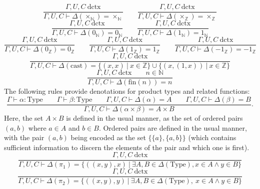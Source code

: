 \documentclass[11pt]{article}
\begin{document}
\begin{equation}
	\frac{\Gamma,U,C\ \text{dctx}}
	{\Gamma,U,C \vdash \Delta(\times_{\mathbb{N}}) = \times_{\mathbb{N}}}
	\qquad
	\frac{\Gamma,U,C\ \text{dctx}}
	{\Gamma,U,C \vdash \Delta(\times_{\mathbb{Z}}) = \times_{\mathbb{Z}}}
\end{equation}
\begin{equation}
	\frac{\Gamma,U,C\ \text{dctx}}
	{\Gamma,U,C \vdash \Delta(0_{\mathbb{N}}) = 0_{\mathbb{N}}}
	\qquad
	\frac{\Gamma,U,C\ \text{dctx}}
	{\Gamma,U,C \vdash \Delta(1_{\mathbb{N}}) = 1_{\mathbb{N}}}
\end{equation}
\begin{equation}
	\frac{\Gamma,U,C\ \text{dctx}}
	{\Gamma,U,C \vdash \Delta(0_{\mathbb{Z}}) = 0_{\mathbb{Z}}}
	\qquad
	\frac{\Gamma,U,C\ \text{dctx}}
	{\Gamma,U,C \vdash \Delta(1_{\mathbb{Z}}) = 1_{\mathbb{Z}}}
	\qquad
	\frac{\Gamma,U,C\ \text{dctx}}
	{\Gamma,U,C \vdash \Delta(-1_{\mathbb{Z}}) = -1_{\mathbb{Z}}}
\end{equation}
\begin{equation}
	\frac{\Gamma,U,C\ \text{dctx}}
	{\Gamma,U,C \vdash \Delta(\text{cast}) =
	\{(x,x)\ |\ x \in \mathbb{Z}\} \cup
	\{(x,(1,x))\ |\ x \in \mathbb{Z}\}}
\end{equation}
\begin{equation}
	\frac{\Gamma,U,C\ \text{dctx}
	\qquad n \in \mathbb{N}}
	{\Gamma,U,C \vdash \Delta(\text{fin}(n)) = n}
\end{equation}
The following rules provide denotations for product types and
related functions:
\begin{equation}
	\frac{\Gamma \vdash \alpha : \text{Type}
	\qquad \Gamma \vdash \beta : \text{Type}
	\qquad \Gamma,U,C \vdash \Delta(\alpha) = A
	\qquad \Gamma,U,C \vdash \Delta(\beta) = B}
	{\Gamma,U,C \vdash \Delta(\alpha \times \beta) = A \times B}.
\end{equation}
Here, the set $A \times B$ is defined in the usual manner, as the
set of ordered pairs $(a,b)$ where $a \in A$ and $b \in B$.
Ordered pairs are defined in the usual manner, with the pair
$(a,b)$ being encoded as the set $\{\{a\},\{a,b\}\}$
(which contains sufficient information to discern the elements of the pair and which one is first).
\begin{equation}
	\frac{\Gamma,U,C\ \text{dctx}}
	{\Gamma,U,C \vdash \Delta(\pi_1) =
	\{((x,y),x)\ |\ \exists A, B \in \Delta(\text{Type}),
	x \in A \wedge y \in B\}}
\end{equation}
\begin{equation}
	\frac{\Gamma,U,C\ \text{dctx}}
	{\Gamma,U,C \vdash \Delta(\pi_2) =
	\{((x,y),y)\ |\ \exists A, B \in \Delta(\text{Type}),
	\ x \in A \wedge y \in B\}}
\end{equation}
\end{document}
